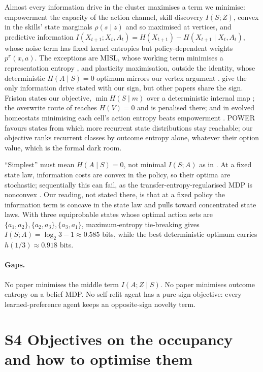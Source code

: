 \documentclass[10pt]{article}
\begin{document}
Almost every information drive in the cluster maximises a term we minimise: empowerment the capacity of the action channel, skill discovery $I(S;Z)$, convex in the skills' state marginals $\rho(s\mid z)$ and so maximised at vertices, and predictive information $I(X_{t+1};X_t,A_t)=H(X_{t+1})-H(X_{t+1}\mid X_t,A_t)$, whose noise term has fixed kernel entropies but policy-dependent weights $p^\pi(x,a)$. The exceptions are MISL, whose working term minimises a representation entropy \citep{Zheng-misl24}, and plasticity maximisation, outside the identity, whose deterministic $H(A\mid S)=0$ optimum mirrors our vertex argument \citep{Lucas-bellman26}. \citet{Kolchinsky-semantic18} give the only information drive stated with our sign, but other papers share the sign. Friston states our objective, $\min H(S\mid m)$ over a deterministic internal map \citep{Friston-free12c}; the overwrite route of \citet{Csaky-prediction26} reaches $H(V)=0$ and is penalised there; and in evolved homeostats minimising each cell's action entropy beats empowerment \citep{Grasso-selection23}. POWER favours states from which more recurrent state distributions stay reachable; our objective ranks recurrent classes by outcome entropy alone, whatever their option value, which is the formal dark room.

``Simplest'' must mean $H(A\mid S)=0$, not minimal $I(S;A)$ as in \citet{Bastankhah-learning26}. At a fixed state law, information costs are convex in the policy, so their optima are stochastic; sequentially this can fail, as the transfer-entropy-regularised MDP is nonconvex \citep{Tanaka-transfer17}. Our reading, not stated there, is that at a fixed policy the information term is concave in the state law and pulls toward concentrated state laws. With three equiprobable states whose optimal action sets are $\{a_1,a_2\},\{a_2,a_3\},\{a_3,a_1\}$, maximum-entropy tie-breaking gives $I(S;A)=\log_2 3-1\approx 0.585$ bits, while the best deterministic optimum carries $h(1/3)\approx 0.918$ bits.

\paragraph{Gaps.}
No paper minimises the middle term $I(A;Z\mid S)$. No paper minimises outcome entropy on a belief MDP. No self-refit agent has a pure-sign objective: every learned-preference agent keeps an opposite-sign novelty term.

\section{S4 Objectives on the occupancy and how to optimise them}
\end{document}
